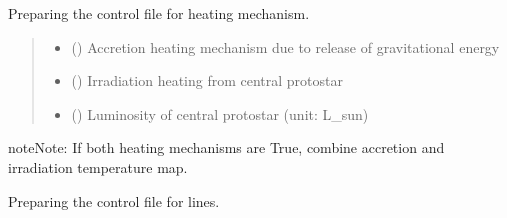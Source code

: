 \documentclass[a4paper,11pt,english]{sphinxmanual}
\begin{document}
\begin{fulllineitems}
\begin{fulllineitems}
\label{\detokenize{radmc3d:setup.radmc3d_setup.get_heatcontrol}}
\pysigstartsignatures
\pysiglinewithargsret
{}
{\sphinxparamcomma {}\sphinxparamcomma {}\sphinxparamcomma {}\sphinxparamcomma {}}
{}
\pysigstopsignatures
\sphinxAtStartPar
Preparing the control file for heating mechanism.
\begin{quote}\begin{description}
\begin{itemize}
\item {} 
\sphinxAtStartPar
{} () \textendash{} Accretion heating mechanism due to release of gravitational energy

\item {} 
\sphinxAtStartPar
{} () \textendash{} Irradiation heating from central protostar

\item {} 
\sphinxAtStartPar
{} () \textendash{} Luminosity of central protostar (unit: L\_sun)

\end{itemize}

\end{description}\end{quote}

\begin{sphinxadmonition}{note}{Note:}
\sphinxAtStartPar
If both heating mechanisms are True, combine accretion and irradiation temperature map.
\end{sphinxadmonition}

\end{fulllineitems}


\begin{fulllineitems}
\label{\detokenize{radmc3d:setup.radmc3d_setup.get_linecontrol}}
\pysigstartsignatures
\pysiglinewithargsret
{}
{\sphinxparamcomma {}\sphinxparamcomma {}}
{}
\pysigstopsignatures
\sphinxAtStartPar
Preparing the control file for lines.


\end{fulllineitems}
\end{fulllineitems}
\end{document}
